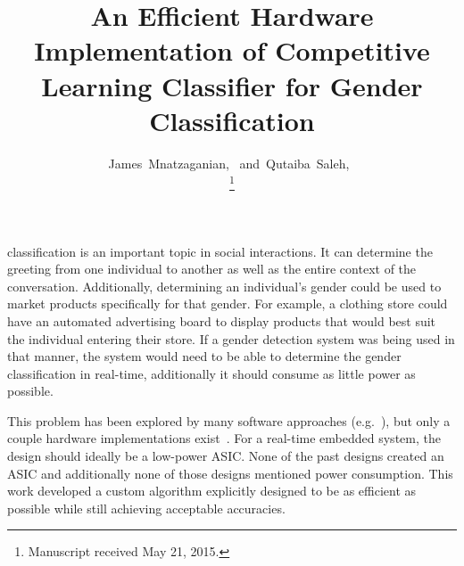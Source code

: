 \documentclass[10pt,journal]{IEEEtran}
\begin{document}
	
	\title{An Efficient Hardware Implementation of Competitive Learning Classifier for Gender Classification}
	
	\author{
		James~Mnatzaganian,~
        and~Qutaiba~Saleh,~%
	
		
		\thanks{Manuscript received May 21, 2015.}
	}
	
	

	\maketitle
	\IEEEdisplaynontitleabstractindextext
	
		classification is an important topic in social interactions. It can determine the greeting from one individual to another as well as the entire context of the conversation. Additionally, determining an individual's gender could be used to market products specifically for that gender. For example, a clothing store could have an automated advertising board to display products that would best suit the individual entering their store. If a gender detection system was being used in that manner, the system would need to be able to determine the gender classification in real-time, additionally it should consume as little power as possible.
		
		This problem has been explored by many software approaches (e.g.~\cite{sw_comparison,sw_svm,sw_cnn}), but only a couple hardware implementations exist~\cite{ann_fpga,svm_fpga}. For a real-time embedded system, the design should ideally be a low-power ASIC. None of the past designs created an ASIC and additionally none of those designs mentioned power consumption. This work developed a custom algorithm explicitly designed to be as efficient as possible while still achieving acceptable accuracies.
	
\end{document}
